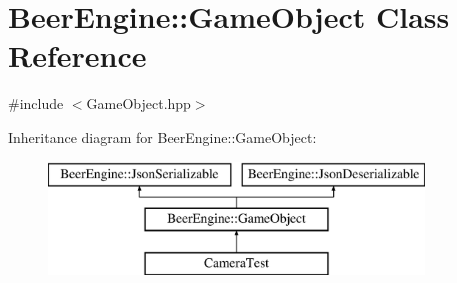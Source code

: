 \hypertarget{class_beer_engine_1_1_game_object}{}\section{Beer\+Engine\+:\+:Game\+Object Class Reference}
\label{class_beer_engine_1_1_game_object}


{\ttfamily \#include $<$Game\+Object.\+hpp$>$}

Inheritance diagram for Beer\+Engine\+:\+:Game\+Object\+:\begin{figure}[H]
\begin{center}
\leavevmode
\includegraphics[height=3.000000cm]{class_beer_engine_1_1_game_object}
\end{center}
\end{figure}
